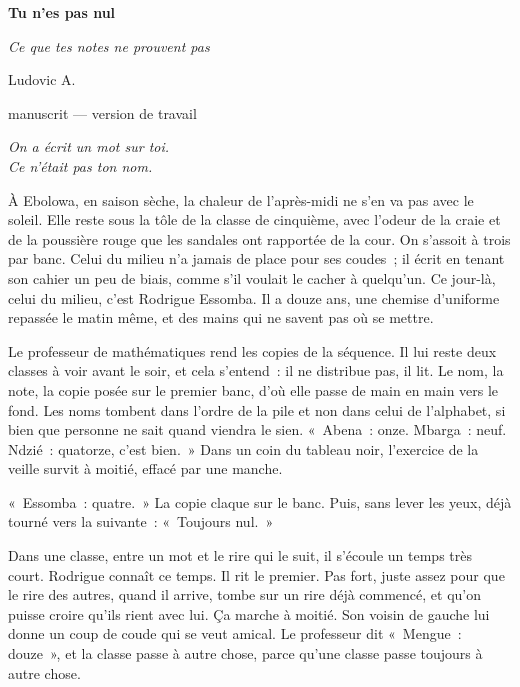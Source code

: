 \documentclass[10.5pt,twoside,openright]{book}
\newcommand{\chapitresn}[1]{\cleardoublepage\markright{#1}\thispagestyle{plain}\vspace*{2.8cm}{\noindent\LARGE\bfseries #1\par}\vspace{1.6em}\noindent\ignorespaces}
\begin{document}
\frontmatter

\begin{titlepage}\centering\vspace*{3cm}
{\Huge\bfseries Tu n’es pas nul\par}\vspace{0.6cm}
{\large\itshape Ce que tes notes ne prouvent pas\par}\vspace{2.2cm}
{\Large Ludovic A.\par}\vfill{\small manuscrit — version de travail\par}\end{titlepage}
\thispagestyle{empty}\cleardoublepage
\thispagestyle{empty}\vspace*{\fill}\begin{center}\itshape On a écrit un mot sur toi.\\Ce n’était pas ton nom.\end{center}\vspace*{\fill}\cleardoublepage

\mainmatter
\chapitresn{Prologue — Le mot}

À Ebolowa, en saison sèche, la chaleur de l’après-midi ne s’en va pas avec le soleil. Elle reste sous la tôle de la classe de cinquième, avec l’odeur de la craie et de la poussière rouge que les sandales ont rapportée de la cour. On s’assoit à trois par banc. Celui du milieu n’a jamais de place pour ses coudes ; il écrit en tenant son cahier un peu de biais, comme s’il voulait le cacher à quelqu’un. Ce jour-là, celui du milieu, c’est Rodrigue Essomba. Il a douze ans, une chemise d’uniforme repassée le matin même, et des mains qui ne savent pas où se mettre.

Le professeur de mathématiques rend les copies de la séquence. Il lui reste deux classes à voir avant le soir, et cela s’entend : il ne distribue pas, il lit. Le nom, la note, la copie posée sur le premier banc, d’où elle passe de main en main vers le fond. Les noms tombent dans l’ordre de la pile et non dans celui de l’alphabet, si bien que personne ne sait quand viendra le sien. « Abena : onze. Mbarga : neuf. Ndzié : quatorze, c’est bien. » Dans un coin du tableau noir, l’exercice de la veille survit à moitié, effacé par une manche.

« Essomba : quatre. » La copie claque sur le banc. Puis, sans lever les yeux, déjà tourné vers la suivante : « Toujours nul. »

Dans une classe, entre un mot et le rire qui le suit, il s’écoule un temps très court. Rodrigue connaît ce temps. Il rit le premier. Pas fort, juste assez pour que le rire des autres, quand il arrive, tombe sur un rire déjà commencé, et qu’on puisse croire qu’ils rient avec lui. Ça marche à moitié. Son voisin de gauche lui donne un coup de coude qui se veut amical. Le professeur dit « Mengue : douze », et la classe passe à autre chose, parce qu’une classe passe toujours à autre chose.
\end{document}
